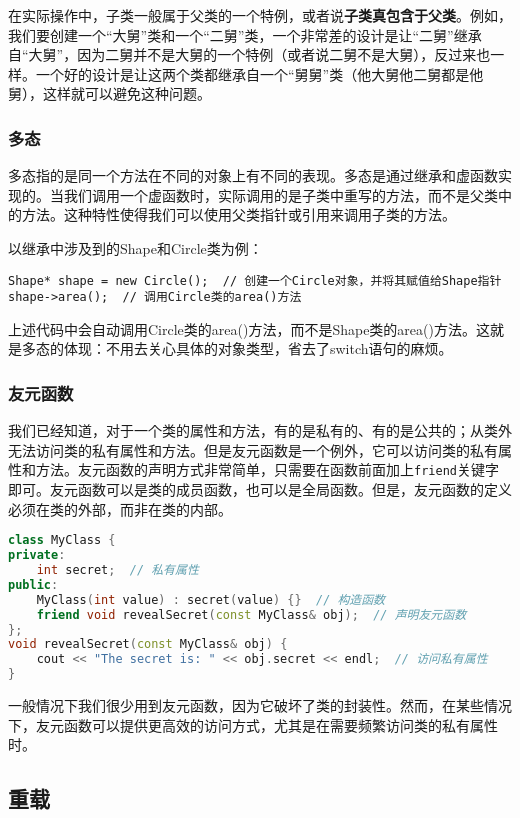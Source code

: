 \documentclass[../main.tex]{subfiles}
\begin{document}
在实际操作中，子类一般属于父类的一个特例，或者说\textbf{子类真包含于父类}。例如，我们要创建一个“大舅”类和一个“二舅”类，一个非常差的设计是让“二舅”继承自“大舅”，因为二舅并不是大舅的一个特例（或者说二舅不是大舅），反过来也一样。一个好的设计是让这两个类都继承自一个“舅舅”类（他大舅他二舅都是他舅），这样就可以避免这种问题。

\subsubsection{多态}

多态指的是同一个方法在不同的对象上有不同的表现。多态是通过继承和虚函数实现的。当我们调用一个虚函数时，实际调用的是子类中重写的方法，而不是父类中的方法。这种特性使得我们可以使用父类指针或引用来调用子类的方法。

以继承中涉及到的Shape和Circle类为例：
\begin{lstlisting}
Shape* shape = new Circle();  // 创建一个Circle对象，并将其赋值给Shape指针
shape->area();  // 调用Circle类的area()方法
\end{lstlisting}
上述代码中会自动调用Circle类的area()方法，而不是Shape类的area()方法。这就是多态的体现：不用去关心具体的对象类型，省去了switch语句的麻烦。

\subsubsection{友元函数}

我们已经知道，对于一个类的属性和方法，有的是私有的、有的是公共的；从类外无法访问类的私有属性和方法。但是友元函数是一个例外，它可以访问类的私有属性和方法。友元函数的声明方式非常简单，只需要在函数前面加上\texttt{friend}关键字即可。友元函数可以是类的成员函数，也可以是全局函数。但是，友元函数的定义必须在类的外部，而非在类的内部。
\begin{lstlisting}[language=C++]
class MyClass {
private:
    int secret;  // 私有属性
public:
    MyClass(int value) : secret(value) {}  // 构造函数
    friend void revealSecret(const MyClass& obj);  // 声明友元函数
};
void revealSecret(const MyClass& obj) {
    cout << "The secret is: " << obj.secret << endl;  // 访问私有属性
}
\end{lstlisting}

一般情况下我们很少用到友元函数，因为它破坏了类的封装性。然而，在某些情况下，友元函数可以提供更高效的访问方式，尤其是在需要频繁访问类的私有属性时。

\subsection{重载}
\end{document}
